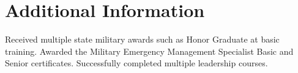 
\section{Additional Information}

\parindent 0.0cm %
Received multiple state military awards such as Honor Graduate at basic training. Awarded the Military Emergency Management Specialist Basic and Senior certificates. Successfully completed multiple leadership courses.